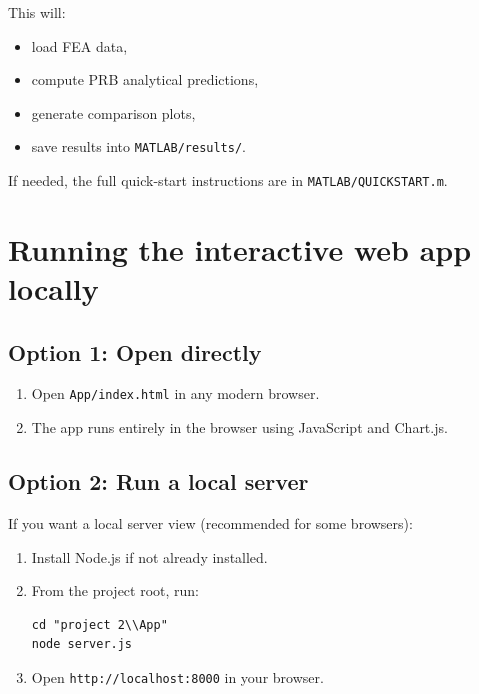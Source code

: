 \documentclass[11pt]{article}
\begin{document}
This will:
\begin{itemize}[leftmargin=*, itemsep=0.5em]
  \item load FEA data,
  \item compute PRB analytical predictions,
  \item generate comparison plots,
  \item save results into \texttt{MATLAB/results/}.
\end{itemize}

If needed, the full quick-start instructions are in \texttt{MATLAB/QUICKSTART.m}.

\section*{Running the interactive web app locally}
\subsection*{Option 1: Open directly}
\begin{enumerate}[leftmargin=*, itemsep=0.5em]
  \item Open \texttt{App/index.html} in any modern browser.
  \item The app runs entirely in the browser using JavaScript and Chart.js.
\end{enumerate}

\subsection*{Option 2: Run a local server}
If you want a local server view (recommended for some browsers):
\begin{enumerate}[leftmargin=*, itemsep=0.5em]
  \item Install Node.js if not already installed.
  \item From the project root, run:
    \begin{verbatim}
cd "project 2\\App"
node server.js
    \end{verbatim}
  \item Open \texttt{http://localhost:8000} in your browser.
\end{enumerate}
\end{document}
